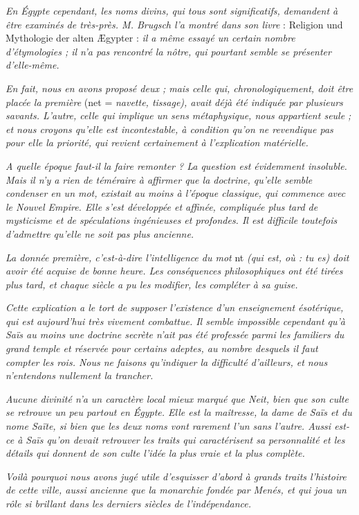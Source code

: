 \documentclass[a4paper, 11pt, oneside]{article}
\begin{document}
\emph{En Égypte cependant, les noms divins, qui tous sont significatifs, demandent à être examinés de très-près. M. Brugsch l'a montré dans son livre} : Religion und Mythologie der alten Ægypter : \emph{il a même essayé un certain nombre d'étymologies ; il n'a pas rencontré la nôtre, qui pourtant semble se présenter d'elle-même.}

\emph{En fait, nous en avons proposé deux ; mais celle qui, chronologiquement, doit être placée la première} (net = \emph{navette, tissage), avait déjà été indiquée par plusieurs savants. L'autre, celle qui implique un sens métaphysique, nous appartient seule ; et nous croyons qu'elle est incontestable, à condition qu'on ne revendique pas pour elle la priorité, qui revient certainement à l'explication matérielle.}

\emph{A quelle époque faut-il la faire remonter ? La question est évidemment insoluble. Mais il n'y a rien de téméraire à affirmer que la doctrine, qu'elle semble condenser en un mot, existait au moins à l'époque classique, qui commence avec le Nouvel Empire. Elle s'est développée et affinée, compliquée plus tard de mysticisme et de spéculations ingénieuses et profondes. Il est difficile toutefois d'admettre qu'elle ne soit pas plus ancienne.}

\emph{La donnée première, c'est-à-dire l'intelligence du mot} nt \emph{(qui est, où : tu es) doit avoir été acquise de bonne heure. Les conséquences philosophiques ont été tirées plus tard, et chaque siècle a pu les modifier, les compléter à sa guise.}

\emph{Cette explication a le tort de supposer l'existence d'un enseignement ésotérique, qui est aujourd'hui très vivement combattue. Il semble impossible cependant qu'à Saïs au moins
une doctrine secrète n'ait pas été professée parmi les familiers du grand temple et réservée pour certains adeptes, au nombre desquels il faut compter les rois. Nous ne faisons qu'indiquer la difficulté d'ailleurs, et nous n'entendons nullement la trancher.}

\emph{Aucune divinité n'a un caractère local mieux marqué que Neit, bien que son culte se retrouve un peu partout en Égypte. Elle est la maîtresse, la dame de Saïs et du nome Saïte, si bien que les deux noms vont rarement l'un sans l'autre. Aussi est-ce à Saïs qu'on devait retrouver les traits qui caractérisent sa personnalité et les détails qui donnent de son culte l'idée la plus vraie et la plus complète.}

\emph{Voilà pourquoi nous avons jugé utile d'esquisser d'abord à grands traits l'histoire de cette ville, aussi ancienne que la monarchie fondée par Menés, et qui joua un rôle si brillant dans les derniers siècles de l'indépendance.}
\end{document}
